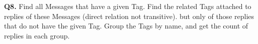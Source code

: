 \textbf{Q8.}
Find all Messages that have a given Tag. Find the related Tags attached
to replies of these Messages (direct relation not transitive). but only
of those replies that do not have the given Tag.
Group the Tags by name, and get the count of replies in each group.
